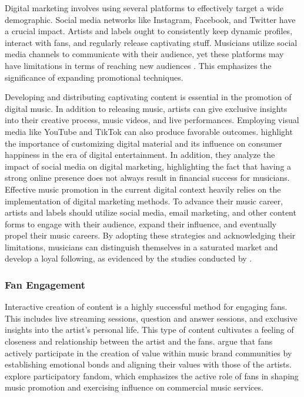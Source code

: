 Digital marketing involves using several platforms to effectively target a wide demographic. Social media networks like Instagram, Facebook, and Twitter have a crucial impact. Artists and labels ought to consistently keep dynamic profiles, interact with fans, and regularly release captivating stuff. Musicians utilize social media channels to communicate with their audience, yet these platforms may have limitations in terms of reaching new audiences \parencite{haynes18}. This emphasizes the significance of expanding promotional techniques. \pagebreak

Developing and distributing captivating content is essential in the promotion of digital music. In addition to releasing music, artists can give exclusive insights into their creative process, music videos, and live performances. Employing visual media like YouTube and TikTok can also produce favorable outcomes. \textcite{basaran22} highlight the importance of customizing digital material and its influence on consumer happiness in the era of digital entertainment. In addition, they analyze the impact of social media on digital marketing, highlighting the fact that having a strong online presence does not always result in financial success for musicians. \\

Effective music promotion in the current digital context heavily relies on the implementation of digital marketing methods. To advance their music career, artists and labels should utilize social media, email marketing, and other content forms to engage with their audience, expand their influence, and eventually propel their music careers. By adopting these strategies and acknowledging their limitations, musicians can distinguish themselves in a saturated market and develop a loyal following, as evidenced by the studies conducted by \textcite{haynes18,basaran22}.

\subsubsection{Fan Engagement}
Interactive creation of content is a highly successful method for engaging fans. This includes live streaming sessions, question and answer sessions, and exclusive insights into the artist's personal life. This type of content cultivates a feeling of closeness and relationship between the artist and the fans. \textcite{edlom21} argue that fans actively participate in the creation of value within music brand communities by establishing emotional bonds and aligning their values with those of the artists. \textcite{lee20} explore participatory fandom, which emphasizes the active role of fans in shaping music promotion and exercising influence on commercial music services. \pagebreak

